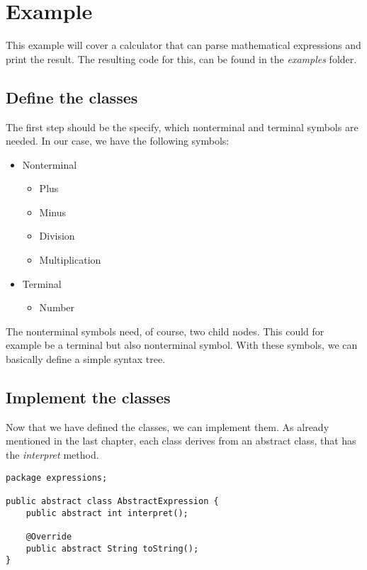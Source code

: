 \chapter{Example}

This example will cover a calculator that can parse mathematical expressions and print the result. The resulting code for this, can be found in the \textit{examples} folder. 


\section{Define the classes}

The first step should be the specify, which nonterminal and terminal symbols are needed. In our case, we have the following symbols: 

\begin{itemize}
    \item Nonterminal
    \begin{itemize}
        \item Plus
        \item Minus
        \item Division
        \item Multiplication
    \end{itemize}

    \item Terminal
    \begin{itemize}
        \item Number
    \end{itemize}
\end{itemize}

The nonterminal symbols need, of course, two child nodes. This could for example be a terminal but also nonterminal symbol. With these symbols, we can basically define a simple syntax tree. 



\section{Implement the classes}

Now that we have defined the classes, we can implement them. As already mentioned in the last chapter, each class derives from an abstract class, that has the \textit{interpret} method. 

\begin{verbatim}
package expressions;

public abstract class AbstractExpression {
    public abstract int interpret();

    @Override
    public abstract String toString();
}
\end{verbatim}

